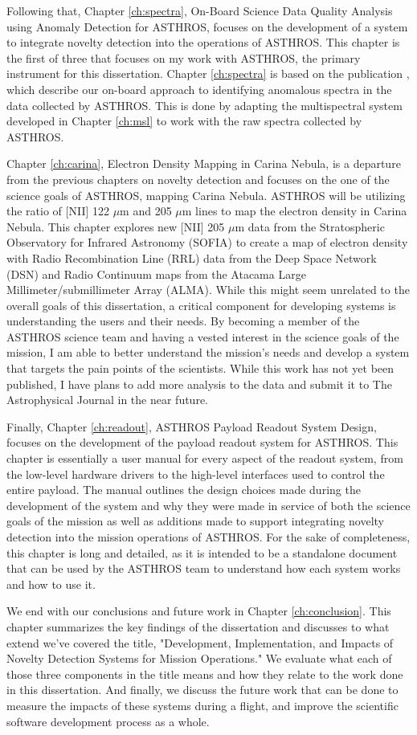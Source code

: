Following that, Chapter \ref{ch:spectra}, On-Board Science Data Quality Analysis using Anomaly Detection for ASTHROS, focuses on the development of a system to integrate novelty detection into the operations of ASTHROS.
This chapter is the first of three that focuses on my work with ASTHROS, the primary instrument for this dissertation.
Chapter \ref{ch:spectra} is based on the publication \cite{horton2024onboard}, which describe our on-board approach to identifying anomalous spectra in the data collected by ASTHROS.
This is done by adapting the multispectral system developed in Chapter \ref{ch:msl} to work with the raw spectra collected by ASTHROS.

Chapter \ref{ch:carina}, Electron Density Mapping in Carina Nebula, is a departure from the previous chapters on novelty detection and focuses on the one of the science goals of ASTHROS, mapping Carina Nebula. 
ASTHROS will be utilizing the ratio of [NII] 122 $\mu$m and 205 $\mu$m lines to map the electron density in Carina Nebula.
This chapter explores new [NII] 205 $\mu$m data from the Stratospheric Observatory for Infrared Astronomy (SOFIA) to create a map of electron density with Radio Recombination Line (RRL) data from the Deep Space Network (DSN) and Radio Continuum maps from the Atacama Large Millimeter/submillimeter Array (ALMA).
While this might seem unrelated to the overall goals of this dissertation, a critical component for developing systems is understanding the users and their needs.
By becoming a member of the ASTHROS science team and having a vested interest in the science goals of the mission, I am able to better understand the mission's needs and develop a system that targets the pain points of the scientists.
While this work has not yet been published, I have plans to add more analysis to the data and submit it to The Astrophysical Journal in the near future.

Finally, Chapter \ref{ch:readout}, ASTHROS Payload Readout System Design, focuses on the development of the payload readout system for ASTHROS.
This chapter is essentially a user manual for every aspect of the readout system, from the low-level hardware drivers to the high-level interfaces used to control the entire payload.
The manual outlines the design choices made during the development of the system and why they were made in service of both the science goals of the mission as well as additions made to support integrating novelty detection into the mission operations of ASTHROS.
For the sake of completeness, this chapter is long and detailed, as it is intended to be a standalone document that can be used by the ASTHROS team to understand how each system works and how to use it.

We end with our conclusions and future work in Chapter \ref{ch:conclusion}.
This chapter summarizes the key findings of the dissertation and discusses to what extend we've covered the title, "Development, Implementation, and Impacts of Novelty Detection Systems for Mission Operations."
We evaluate what each of those three components in the title means and how they relate to the work done in this dissertation.
And finally, we discuss the future work that can be done to measure the impacts of these systems during a flight, and improve the scientific software development process as a whole.